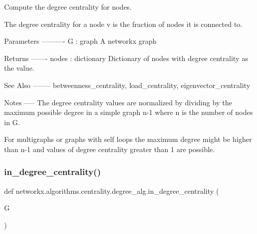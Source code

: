 \begin{DoxyVerb}Compute the degree centrality for nodes.

The degree centrality for a node v is the fraction of nodes it
is connected to.

Parameters
----------
G : graph
  A networkx graph

Returns
-------
nodes : dictionary
   Dictionary of nodes with degree centrality as the value.

See Also
--------
betweenness_centrality, load_centrality, eigenvector_centrality

Notes
-----
The degree centrality values are normalized by dividing by the maximum
possible degree in a simple graph n-1 where n is the number of nodes in G.

For multigraphs or graphs with self loops the maximum degree might
be higher than n-1 and values of degree centrality greater than 1
are possible.
\end{DoxyVerb}
 \mbox{\label{namespacenetworkx_1_1algorithms_1_1centrality_1_1degree__alg_adb5a7769931b930d9e7a864745df51fa}} 
\subsubsection{\texorpdfstring{in\+\_\+degree\+\_\+centrality()}{in\_degree\_centrality()}}
{\footnotesize\ttfamily def networkx.\+algorithms.\+centrality.\+degree\+\_\+alg.\+in\+\_\+degree\+\_\+centrality (\begin{DoxyParamCaption}\item[{}]{G }\end{DoxyParamCaption})}

